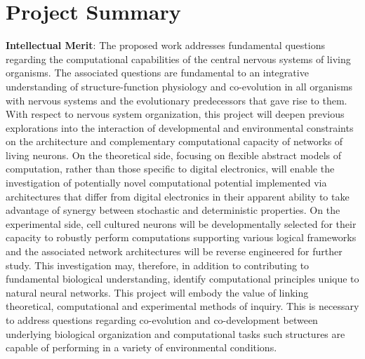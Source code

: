 \section{Project Summary}
\textbf{Intellectual Merit}: \noindent The proposed work addresses fundamental questions regarding the computational capabilities of the central nervous systems of living organisms. The associated questions are fundamental to an integrative understanding of structure-function physiology and co-evolution in all organisms with nervous systems and the evolutionary predecessors that gave rise to them. With respect to nervous system organization, this project will deepen previous explorations into the interaction of developmental and environmental constraints on the architecture and complementary computational capacity of networks of living neurons. On the theoretical side, focusing on flexible abstract models of computation, rather than those specific to digital electronics, will enable the investigation of potentially novel computational potential implemented via architectures that differ from digital electronics in their apparent ability to take advantage of synergy between stochastic and deterministic properties. On the experimental side, cell cultured neurons will be developmentally selected for their capacity to robustly perform computations supporting various logical frameworks and the associated network architectures will be reverse engineered for further study. This investigation may, therefore, in addition to contributing to fundamental biological understanding, identify computational principles unique to natural neural networks. This project will embody the value of linking theoretical, computational and experimental methods of inquiry. This is necessary to address questions regarding co-evolution and co-development between underlying biological organization and computational tasks such structures are capable of performing in a variety of environmental conditions.

